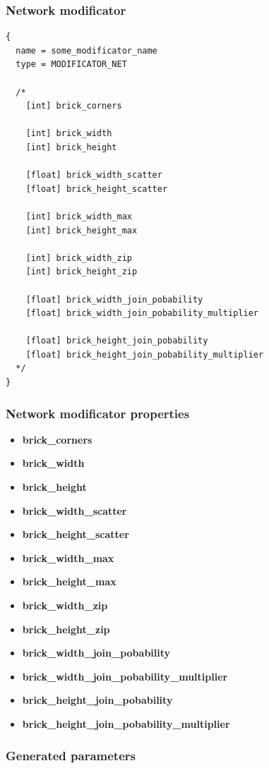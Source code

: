 \documentclass[9pt]{article}
\begin{document}
\subsubsection{Network modificator}

\begin{verbatim}
{
  name = some_modificator_name
  type = MODIFICATOR_NET

  /*
    [int] brick_corners
        
    [int] brick_width
    [int] brick_height
        
    [float] brick_width_scatter
    [float] brick_height_scatter
        
    [int] brick_width_max
    [int] brick_height_max
        
    [int] brick_width_zip
    [int] brick_height_zip
        
    [float] brick_width_join_pobability
    [float] brick_width_join_pobability_multiplier
        
    [float] brick_height_join_pobability
    [float] brick_height_join_pobability_multiplier
  */
}
\end{verbatim}
\subsubsection*{Network modificator properties}
\begin{itemize}
\item{\bf brick\_corners}
\item{\bf brick\_width}
\item{\bf brick\_height}
\item{\bf brick\_width\_scatter}
\item{\bf brick\_height\_scatter}
\item{\bf brick\_width\_max}
\item{\bf brick\_height\_max}
\item{\bf brick\_width\_zip}
\item{\bf brick\_height\_zip}
\item{\bf brick\_width\_join\_pobability}
\item{\bf brick\_width\_join\_pobability\_multiplier}
\item{\bf brick\_height\_join\_pobability}
\item{\bf brick\_height\_join\_pobability\_multiplier}
\end{itemize}

\subsubsection*{Generated parameters}
\end{document}
